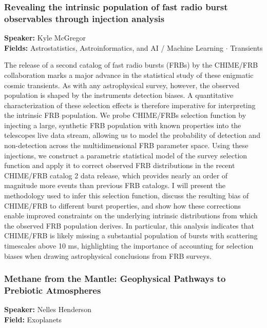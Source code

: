 \hypertarget{abstract-talk-227}{}\label{abstract-page-talk-227}
\subsubsection*{Revealing the intrinsic population of fast radio burst observables through injection analysis}
\textbf{Speaker:} Kyle McGregor\\
\textbf{Fields:} Astrostatistics, Astroinformatics, and AI / Machine Learning $\cdot$ Transients

The release of a second catalog of fast radio bursts (FRBs) by the CHIME/FRB collaboration marks a major advance in the statistical study of these enigmatic cosmic transients. As with any astrophysical survey, however, the observed population is shaped by the instruments detection biases. A quantitative characterization of these selection effects is therefore imperative for interpreting the intrinsic FRB population. We probe CHIME/FRBs selection function by injecting a large, synthetic FRB population with known properties into the telescopes live data stream, allowing us to model the probability of detection and non-detection across the multidimensional FRB parameter space. Using these injections, we construct a parametric statistical model of the survey selection function and apply it to correct observed FRB distributions in the recent CHIME/FRB catalog 2 data release, which provides nearly an order of magnitude more events than previous FRB catalogs. I will present the methodology used to infer this selection function, discuss the resulting bias of CHIME/FRB to different burst properties, and show how these corrections enable improved constraints on the underlying intrinsic distributions from which the observed FRB population derives. In particular, this analysis indicates that CHIME/FRB is likely missing a substantial population of bursts with scattering timescales above 10 ms, highlighting the importance of accounting for selection biases when drawing astrophysical conclusions from FRB surveys.

\hypertarget{abstract-talk-68}{}\label{abstract-page-talk-68}
\subsubsection*{Methane from the Mantle: Geophysical Pathways to Prebiotic Atmospheres}
\textbf{Speaker:} Nelles Henderson\\
\textbf{Field:} Exoplanets

